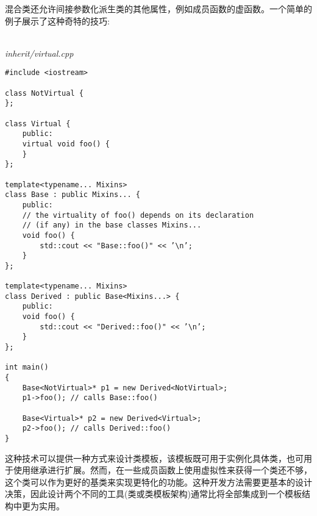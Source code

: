 混合类还允许间接参数化派生类的其他属性，例如成员函数的虚函数。一个简单的例子展示了这种奇特的技巧:

\hspace*{\fill} \\ %
\noindent
\textit{inherit/virtual.cpp}
\begin{lstlisting}[style=styleCXX]
#include <iostream>

class NotVirtual {
};

class Virtual {
	public:
	virtual void foo() {
	}
};

template<typename... Mixins>
class Base : public Mixins... {
	public:
	// the virtuality of foo() depends on its declaration
	// (if any) in the base classes Mixins...
	void foo() {
		std::cout << "Base::foo()" << ’\n’;
	}
};

template<typename... Mixins>
class Derived : public Base<Mixins...> {
	public:
	void foo() {
		std::cout << "Derived::foo()" << ’\n’;
	}
};

int main()
{
	Base<NotVirtual>* p1 = new Derived<NotVirtual>;
	p1->foo(); // calls Base::foo()
	
	Base<Virtual>* p2 = new Derived<Virtual>;
	p2->foo(); // calls Derived::foo()
}
\end{lstlisting}

这种技术可以提供一种方式来设计类模板，该模板既可用于实例化具体类，也可用于使用继承进行扩展。然而，在一些成员函数上使用虚拟性来获得一个类还不够，这个类可以作为更好的基类来实现更特化的功能。这种开发方法需要更基本的设计决策，因此设计两个不同的工具(类或类模板架构)通常比将全部集成到一个模板结构中更为实用。






